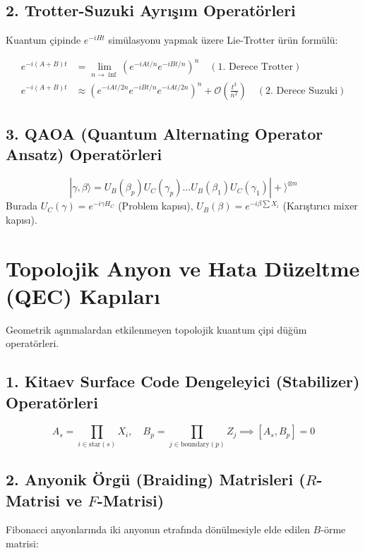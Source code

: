 \documentclass[11pt, a4paper]{article}
\begin{document}
\subsection{2. Trotter-Suzuki Ayrışım Operatörleri}
Kuantum çipinde $e^{-i H t}$ simülasyonu yapmak üzere Lie-Trotter ürün formülü:

\begin{align}
e^{-i (A + B) t} &= \lim_{n \to \inf} \left( e^{-i A t / n} e^{-i B t / n} \right)^n \quad (\text{1. Derece Trotter}) \\
e^{-i (A + B) t} &\approx \left( e^{-i A t / 2n} e^{-i B t / n} e^{-i A t / 2n} \right)^n + \mathcal{O}\left(\frac{t^3}{n^2}\right) \quad (\text{2. Derece Suzuki})
\end{align}

\subsection{3. QAOA (Quantum Alternating Operator Ansatz) Operatörleri}
\begin{equation}
|\gamma, \beta\rangle = U_B(\beta_p) U_C(\gamma_p) \dots U_B(\beta_1) U_C(\gamma_1) |+\rangle^{\otimes n}
\end{equation}
Burada $U_C(\gamma) = e^{-i \gamma H_C}$ (Problem kapısı), $U_B(\beta) = e^{-i \beta \sum X_i}$ (Karıştırıcı mixer kapısı).

\section{Topolojik Anyon ve Hata Düzeltme (QEC) Kapıları}

Geometrik aşınmalardan etkilenmeyen topolojik kuantum çipi düğüm operatörleri.

\subsection{1. Kitaev Surface Code Dengeleyici (Stabilizer) Operatörleri}
\begin{equation}
A_s = \prod_{i \in \text{star}(s)} X_i, \quad B_p = \prod_{j \in \text{boundary}(p)} Z_j \implies [A_s, B_p] = 0
\end{equation}

\subsection{2. Anyonik Örgü (Braiding) Matrisleri ($R$-Matrisi ve $F$-Matrisi)}
Fibonacci anyonlarında iki anyonun etrafında dönülmesiyle elde edilen $B$-örme matrisi:
\end{document}
